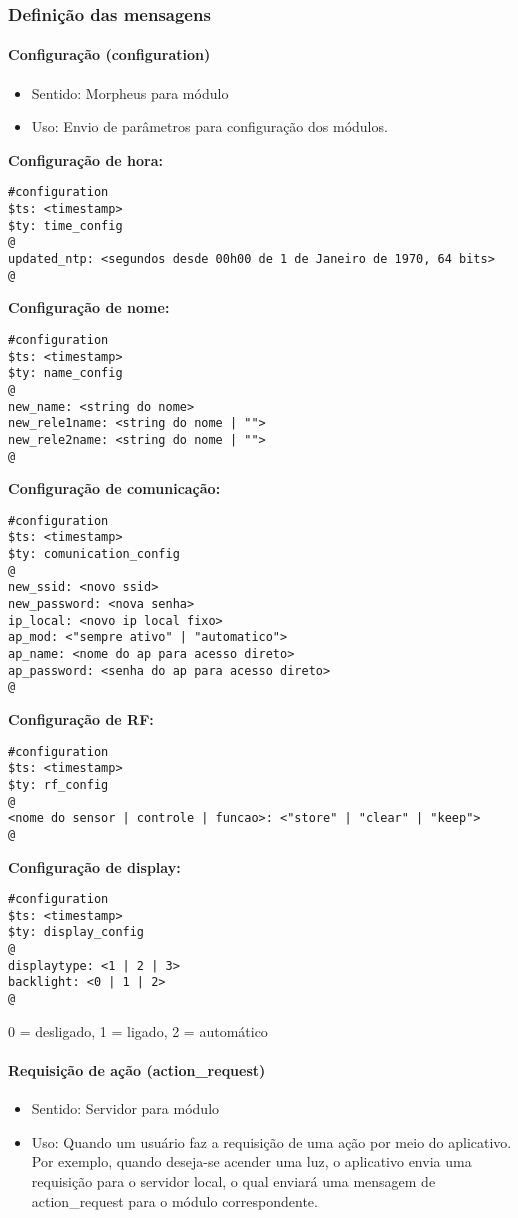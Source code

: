 \subsubsection{Definição das mensagens}

\paragraph{Configuração (configuration)}
\begin{itemize}
\item Sentido: Morpheus para módulo
\item Uso: Envio de parâmetros para configuração dos módulos.
\end{itemize}

\textbf{Configuração de hora:}
\begin{lstlisting}
#configuration
$ts: <timestamp>
$ty: time_config
@
updated_ntp: <segundos desde 00h00 de 1 de Janeiro de 1970, 64 bits>
@
\end{lstlisting}

\textbf{Configuração de nome:}
\begin{lstlisting}
#configuration
$ts: <timestamp>
$ty: name_config
@
new_name: <string do nome>
new_rele1name: <string do nome | "">
new_rele2name: <string do nome | "">
@
\end{lstlisting}

\textbf{Configuração de comunicação:}
\begin{lstlisting}
#configuration
$ts: <timestamp>
$ty: comunication_config
@
new_ssid: <novo ssid>
new_password: <nova senha>
ip_local: <novo ip local fixo>
ap_mod: <"sempre ativo" | "automatico">
ap_name: <nome do ap para acesso direto>
ap_password: <senha do ap para acesso direto>
@
\end{lstlisting}

\textbf{Configuração de RF:}
\begin{lstlisting}
#configuration
$ts: <timestamp>
$ty: rf_config
@
<nome do sensor | controle | funcao>: <"store" | "clear" | "keep">
@
\end{lstlisting}

\textbf{Configuração de display:}
\begin{lstlisting}
#configuration
$ts: <timestamp>
$ty: display_config
@
displaytype: <1 | 2 | 3>
backlight: <0 | 1 | 2>
@
\end{lstlisting}
0 = desligado, 1 = ligado, 2 = automático

\paragraph{Requisição de ação (action\_request)}
\begin{itemize}
\item Sentido: Servidor para módulo
\item Uso: Quando um usuário faz a requisição de uma ação por meio do aplicativo. Por exemplo, quando deseja-se acender uma luz, o aplicativo envia uma requisição para o servidor local, o qual enviará uma mensagem de action\_request para o módulo correspondente.
\end{itemize}

